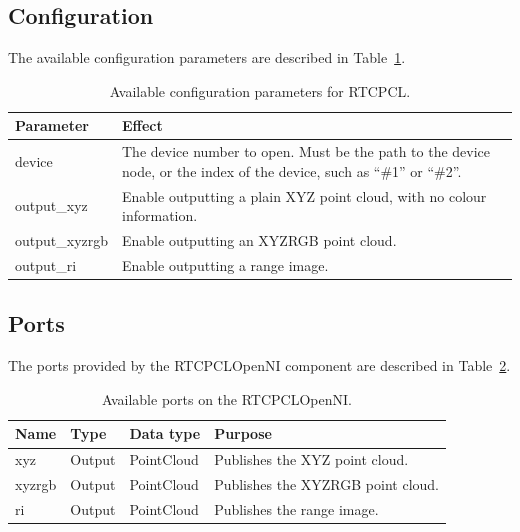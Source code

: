 \documentclass[a4paper,10pt]{article}
\begin{document}
\subsection{Configuration}
\label{sec1:openni_configuration}

The available configuration parameters are described in
Table~\ref{tab:openni_config_params}.

\begin{table}[t]
  \centering
  \begin{tabularx}{\columnwidth}{lX}
    \toprule
    Parameter & Effect \\
    \midrule
    device & The device number to open. Must be the path to the device node, or the index of the device, such as ``\#1'' or ``\#2''. \\
    output\_xyz & Enable outputting a plain XYZ point cloud, with no colour information. \\
    output\_xyzrgb & Enable outputting an XYZRGB point cloud. \\
    output\_ri & Enable outputting a range image. \\
    \bottomrule
  \end{tabularx}
  \caption{Available configuration parameters for RTCPCL.}
  \label{tab:openni_config_params}
\end{table}

\subsection{Ports}
\label{sec1:openni_port}

The ports provided by the RTCPCLOpenNI component are described in Table~\ref{tab:openni_ports}.

\begin{table}[t]
  \centering
  \begin{tabularx}{\columnwidth}{lllX}
    \toprule
    Name & Type & Data type & Purpose \\
    \midrule
    xyz & Output & PointCloud & Publishes the XYZ point cloud. \\
    xyzrgb & Output & PointCloud & Publishes the XYZRGB point cloud. \\
    ri & Output & PointCloud & Publishes the range image. \\
    \bottomrule
  \end{tabularx}
  \caption{Available ports on the RTCPCLOpenNI.}
  \label{tab:openni_ports}
\end{table}
\end{document}
